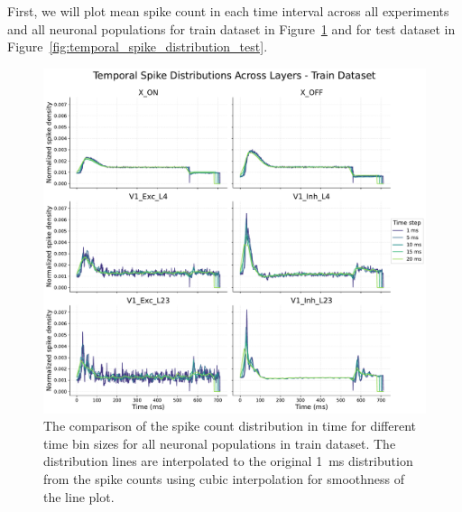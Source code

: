 First, we will plot mean spike count in each time interval across all experiments and all neuronal populations for train dataset in Figure~\ref{fig:temporal_spike_distribution_train} and for test dataset in Figure~\ref{fig:temporal_spike_distribution_test}. 
\begin{figure}
    \centering
    \includegraphics[width=\linewidth]{img/plots/temporal_spike_distribution_train.pdf}
    \caption{The comparison of the spike count distribution in time for different time bin sizes for all neuronal populations in train dataset. The distribution lines are interpolated to the original 1~ms distribution from the spike counts using cubic interpolation for smoothness of the line plot.}
    \label{fig:temporal_spike_distribution_train}
\end{figure}

